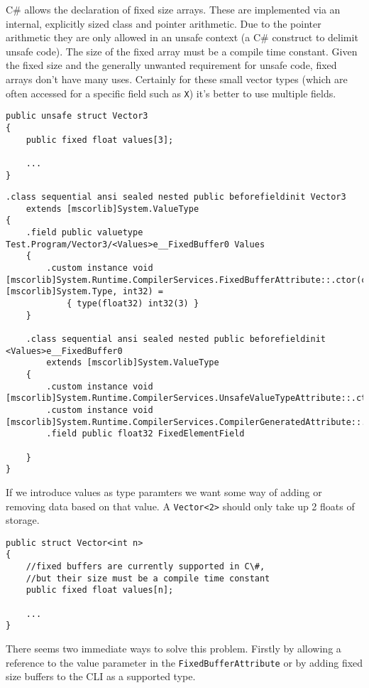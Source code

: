 C\# allows the declaration of fixed size arrays. These are implemented via an internal, explicitly sized class and pointer
arithmetic. Due to the pointer arithmetic they are only allowed in an unsafe context (a C\# construct to delimit unsafe code).
The size of the fixed array must be a compile time constant. Given the fixed size and the generally unwanted requirement for
unsafe code, fixed arrays don't have many uses. Certainly for these small vector types (which are often accessed for a specific 
field such as \texttt{X}) it's better to use multiple fields.

\begin{lstlisting}[caption={A fixed size vector type}, keywordstyle={\color{blue}},language=sharpc]
public unsafe struct Vector3
{
	public fixed float values[3]; 
	
	...
}
\end{lstlisting}

\begin{lstlisting}[caption={Translation to CIL}, keywordstyle={\color{blue}},language=cil]
.class sequential ansi sealed nested public beforefieldinit Vector3
    extends [mscorlib]System.ValueType
{
    .field public valuetype Test.Program/Vector3/<Values>e__FixedBuffer0 Values
    {
        .custom instance void [mscorlib]System.Runtime.CompilerServices.FixedBufferAttribute::.ctor(class [mscorlib]System.Type, int32) = 
			{ type(float32) int32(3) }
    }

    .class sequential ansi sealed nested public beforefieldinit <Values>e__FixedBuffer0
        extends [mscorlib]System.ValueType
    {
        .custom instance void [mscorlib]System.Runtime.CompilerServices.UnsafeValueTypeAttribute::.ctor()
        .custom instance void [mscorlib]System.Runtime.CompilerServices.CompilerGeneratedAttribute::.ctor()
        .field public float32 FixedElementField

    }
}
\end{lstlisting}

If we introduce values as type paramters we want some way of adding or removing data based on that value. A \texttt{Vector<2>} 
should only take up 2 floats of storage. 

\begin{lstlisting}[caption={A fixed size vector type}, keywordstyle={\color{blue}},language=sharpc]
public struct Vector<int n>
{
	//fixed buffers are currently supported in C\#,
	//but their size must be a compile time constant
	public fixed float values[n]; 
	
	...
}
\end{lstlisting}

There seems two immediate ways to solve this problem. Firstly by allowing a reference to the value parameter in the 
\texttt{FixedBufferAttribute} or by adding fixed size buffers to the CLI as a supported type.